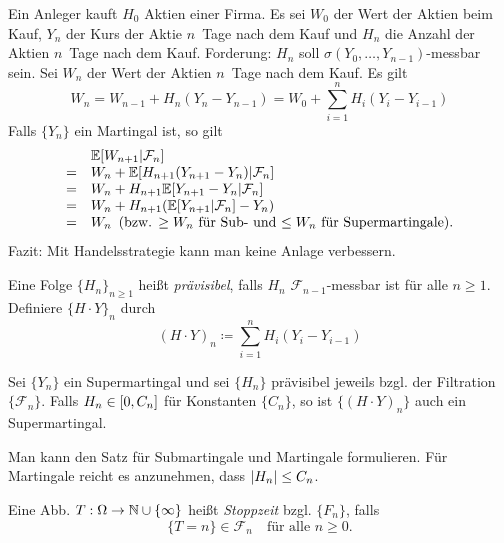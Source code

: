 \documentclass{cheat-sheet}
\newcommand{\E}{\mathbb{E}} %
\newcommand{\Filt}{\mathcal{F}} %
\begin{document}
\begin{bsp}
  Ein Anleger kauft $H_0$ Aktien einer Firma.
  Es sei $W_0$ der Wert der Aktien beim Kauf,
  $Y_n$ der Kurs der Aktie $n$~Tage nach dem Kauf und
  $H_n$ die Anzahl der Aktien $n$~Tage nach dem Kauf.
  Forderung: $H_n$ soll $\sigma(Y_0, \ldots, Y_{n-1})$-messbar sein.
  Sei $W_n$ der Wert der Aktien $n$~Tage nach dem Kauf.
  Es gilt
  \[ W_n = W_{n-1} + H_n (Y_n - Y_{n-1}) = W_0 + {\sum}_{i=1}^n H_i (Y_i - Y_{i-1}) \]
  Falls $\{ Y_n \}$ ein Martingal ist, so gilt
  \[
    \begin{array}{c l}
      & \E[ W_{n+1} | \Filt_n ] \\
      = & W_n + \E[ H_{n+1} (Y_{n+1} - Y_n) | \Filt_n ] \\
      = & W_n + H_{n+1} \E[ Y_{n+1} - Y_n | \Filt_n ] \\
      = & W_n + H_{n+1} (\E[ Y_{n+1} | \Filt_n ] - Y_n) \\
      = & W_n \enspace (\text{bzw. $\geq W_n$ für Sub- und $\leq W_n$ für Supermartingale}).
    \end{array}
  \]
  Fazit: Mit Handelsstrategie kann man keine Anlage verbessern.
\end{bsp}

\begin{defn}
  Eine Folge $\{ H_n \}_{n \geq 1}$ heißt \emph{prävisibel}, falls $H_n$ $\Filt_{n-1}$-messbar ist für alle $n \geq 1$.
  Definiere $\{ H \cdot Y \}_n$ durch
  \[
    (H \cdot Y)_n \coloneqq {\sum}_{i=1}^n H_i (Y_i - Y_{i-1})
  \]
\end{defn}

\begin{satz}
  Sei $\{ Y_n \}$ ein Supermartingal und sei $\{ H_n \}$ prävisibel jeweils bzgl. der Filtration $\{ \Filt_n \}$.
  Falls $H_n \in \left[ 0, C_n \right]$ für Konstanten $\{ C_n \}$, so ist $\{ (H \cdot Y)_n \}$ auch ein Supermartingal.
\end{satz}

\begin{bem}
  Man kann den Satz für Submartingale und Martingale formulieren.
  Für Martingale reicht es anzunehmen, dass $\lvert H_n\rvert \leq C_n$.
\end{bem}

\begin{defn}
  Eine Abb. $T : \Omega \to \mathbb{N} \cup \{ \infty \}$ heißt \emph{Stoppzeit} bzgl. $\{ F_n \}$, falls
  \[
    \{ T=n \} \in \Filt_n
    \quad \text{für alle } n \geq 0.
  \]
\end{defn}
\end{document}
